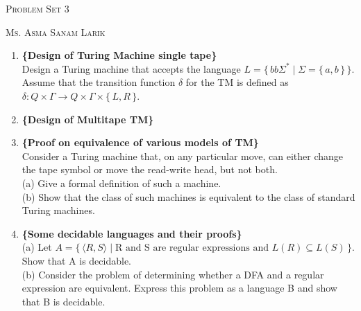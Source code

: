 \documentclass[11pt, article, oneside]{memoir}
\newcommand{\set}[1]{\{\, #1\, \}}
\begin{document}
\begin{center}
\LARGE{\textsc{Problem Set 3}}
 
\large{\textsc{Ms. Asma Sanam Larik}}
\end{center}


\begin{enumerate}
    \item
    \textbf{\{Design of Turing Machine single tape\}}
    \\Design a Turing machine that accepts the language \(L = \set{ bb\Sigma^* \mid \Sigma = \set{a, b}}\). Assume that the transition function \( \delta \) for the TM is defined as \( \delta : Q \times \Gamma \rightarrow Q \times \Gamma \times \set{L,R}\).

    \item
    \textbf{\{Design of Multitape TM\}}

    \item
    \textbf{\{Proof on equivalence of various models of TM\}}
    \\Consider a Turing machine that, on any particular move, can either change the tape symbol or move the read-write head, but not both.
    \\(a) Give a formal definition of such a machine.
    \\(b) Show that the class of such machines is equivalent to the class of standard Turing machines.

    \item
    \textbf{\{Some decidable languages and their proofs\}}
    \\(a) Let \(A = \set{\langle R, S\rangle \mid \text{R and S are regular expressions and }L(R) \subseteq L(S)}\). Show that A is decidable.
    \\(b) Consider the problem of determining whether a DFA and a regular expression are equivalent. Express this problem as a language B and show that B is decidable.


\end{enumerate}
\end{document}
